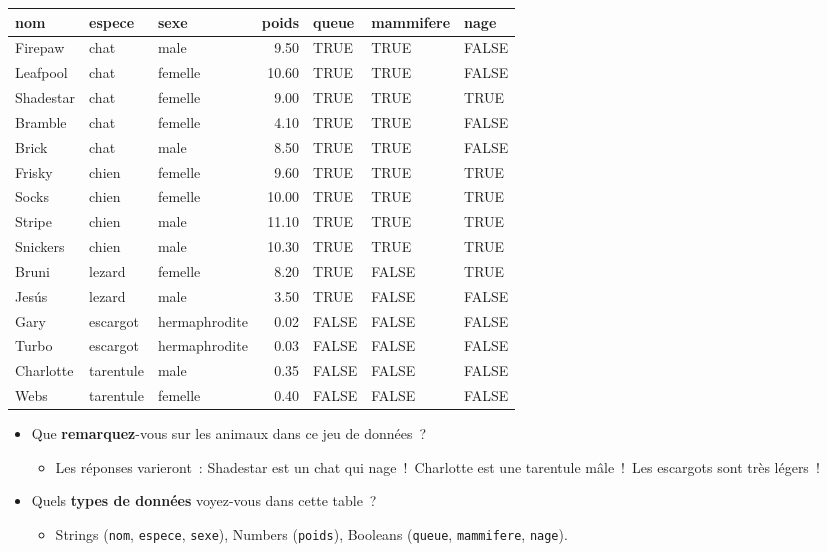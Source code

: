 \documentclass[12pt,a4paper]{article}
\begin{document}
\begin{center}
\begin{tabularx}{\textwidth}{l l l r l l l}
  \toprule
  \textbf{nom} & \textbf{espece} & \textbf{sexe} & \textbf{poids} & \textbf{queue} & \textbf{mammifere} & \textbf{nage} \\
  \midrule
  Firepaw    & chat      & male      & 9.50  & TRUE  & TRUE  & FALSE \\
  Leafpool   & chat      & femelle   & 10.60 & TRUE  & TRUE  & FALSE \\
  Shadestar  & chat      & femelle   & 9.00  & TRUE  & TRUE  & TRUE  \\
  Bramble    & chat      & femelle   & 4.10  & TRUE  & TRUE  & FALSE \\
  Brick      & chat      & male      & 8.50  & TRUE  & TRUE  & FALSE \\
  Frisky     & chien     & femelle   & 9.60  & TRUE  & TRUE  & TRUE  \\
  Socks      & chien     & femelle   & 10.00 & TRUE  & TRUE  & TRUE  \\
  Stripe     & chien     & male      & 11.10 & TRUE  & TRUE  & TRUE  \\
  Snickers   & chien     & male      & 10.30 & TRUE  & TRUE  & TRUE  \\
  Bruni      & lezard    & femelle   & 8.20  & TRUE  & FALSE & TRUE  \\
  Jesús      & lezard    & male      & 3.50  & TRUE  & FALSE & FALSE \\
  Gary       & escargot  & hermaphrodite & 0.02  & FALSE & FALSE & FALSE \\
  Turbo      & escargot  & hermaphrodite & 0.03  & FALSE & FALSE & FALSE \\
  Charlotte  & tarentule & male      & 0.35  & FALSE & FALSE & FALSE \\
  Webs       & tarentule & femelle   & 0.40  & FALSE & FALSE & FALSE \\
  \bottomrule
\end{tabularx}
\end{center}

\begin{thinkbox}
  \begin{itemize}
    \item Que \textbf{remarquez}-vous sur les animaux dans ce jeu de données~?
    \begin{itemize}
      \item Les réponses varieront~: Shadestar est un chat qui nage~!~Charlotte est une tarentule mâle~!~Les escargots sont très légers~!
    \end{itemize}
    \item Quels \textbf{types de données} voyez-vous dans cette table~?
    \begin{itemize}
      \item Strings (\texttt{nom}, \texttt{espece}, \texttt{sexe}), Numbers (\texttt{poids}), Booleans (\texttt{queue}, \texttt{mammifere}, \texttt{nage}).
    \end{itemize}
  \end{itemize}
\end{thinkbox}
\end{document}
